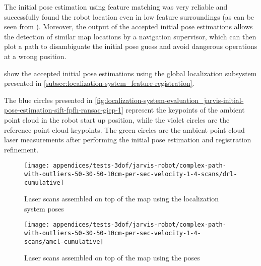 The initial pose estimation using feature matching was very reliable and successfully found the robot location even in low feature surroundings (as can be seen from ). Moreover, the output of the accepted initial pose estimations allows the detection of similar map locations by a navigation supervisor, which can then plot a path to disambiguate the initial pose guess and avoid dangerous operations at a wrong position.

 show the accepted initial pose estimations using the global localization subsystem presented in \cref{subsec:localization-system_feature-registration}.

The blue circles presented in \cref{fig:localization-system-evaluation_jarvis-initial-pose-estimation-sift-fpfh-ransac-gicp-1} represent the keypoints of the ambient point cloud in the robot start up position, while the violet circles are the reference point cloud keypoints. The green circles are the ambient point cloud laser measurements after performing the initial pose estimation and registration refinement.



\begin{figure}[H]
	\centering
	\texttt{[image: appendices/tests-3dof/jarvis-robot/complex-path-with-outliers-50-30-50-10cm-per-sec-velocity-1-4-scans/drl-cumulative]}
	\caption{Laser scans assembled on top of the map using the localization system poses}
	\label{fig:localization-system-evaluation_complex-path-with-outliers-50-30-50-10cm-per-sec-velocity-1-4-scans-drl-cumulative}
\end{figure}

\begin{figure}[H]
	\centering
	\texttt{[image: appendices/tests-3dof/jarvis-robot/complex-path-with-outliers-50-30-50-10cm-per-sec-velocity-1-4-scans/amcl-cumulative]}
	\caption{Laser scans assembled on top of the map using the  poses}
	\label{fig:localization-system-evaluation_complex-path-with-outliers-50-30-50-10cm-per-sec-velocity-1-4-scans-amcl-cumulative}
\end{figure}


